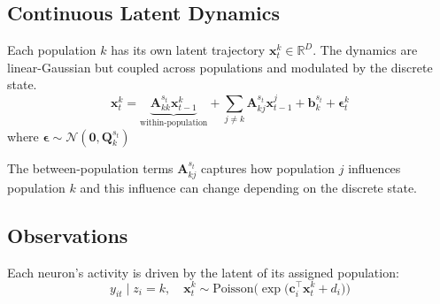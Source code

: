 \documentclass{article}
\begin{document}
\subsection{Continuous Latent Dynamics}
Each population \(k\) has its own latent trajectory \(\boldsymbol{x}_t^k \in \mathbb{R}^D\). The dynamics are linear-Gaussian but coupled across populations and modulated by the discrete state.
\begin{equation}
    \boldsymbol{x}_t^k = \underbrace{\boldsymbol{A}_{kk}^{s_t}\boldsymbol{x}_{t-1}^k}_{\text{within-population}} + \sum_{j\neq k}\boldsymbol{A}_{kj}^{s_t}\boldsymbol{x}_{t-1}^j + \boldsymbol{b}_k^{s_t} + \boldsymbol{\epsilon}_t^k
\end{equation}
where \(\boldsymbol{\epsilon}\sim \boldsymbol{\mathcal{N}}(\boldsymbol{0}, \boldsymbol{Q}_k^{s_t})\)

The between-population terms \(\boldsymbol{A}_{kj}^{s_t}\) captures how population \(j\) influences population \(k\) and this influence can change depending on the discrete state.

\subsection{Observations}
Each neuron's activity is driven by the latent of its assigned population:
\begin{equation}
    y_{it} \mid z_i = k, \quad \boldsymbol{x}_t^k \sim \text{Poisson}\bigg( \exp\big(\boldsymbol{c}_i^\top \boldsymbol{x}_t^k + d_i\big)\bigg)
\end{equation}
\end{document}

